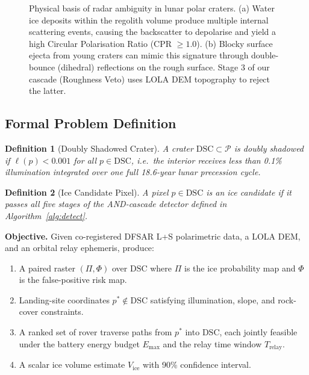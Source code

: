 \documentclass[10pt,conference]{IEEEtran}
\newtheorem{definition}{Definition}
\newcommand{\DSC}{\mathrm{DSC}}
\newcommand{\Vice}{V_{\mathrm{ice}}}
\begin{document}
\begin{figure}[htbp]
\caption{Physical basis of radar ambiguity in lunar polar craters. (a) Water ice deposits within the regolith volume produce multiple internal scattering events, causing the backscatter to depolarise and yield a high Circular Polarisation Ratio (CPR $\ge 1.0$). (b) Blocky surface ejecta from young craters can mimic this signature through double-bounce (dihedral) reflections on the rough surface. Stage 3 of our cascade (Roughness Veto) uses LOLA DEM topography to reject the latter.}
\label{fig:physics_ambiguity}
\end{figure}

\subsection{Formal Problem Definition}

\begin{definition}[Doubly Shadowed Crater]
A crater $\DSC \subset \mathcal{P}$ is doubly shadowed if $\ell(p) < 0.001$
for all $p \in \DSC$, i.e.\ the interior receives less than 0.1\%
illumination integrated over one full 18.6-year lunar precession cycle.
\end{definition}

\begin{definition}[Ice Candidate Pixel]
A pixel $p \in \DSC$ is an ice candidate if it passes all five stages
of the AND-cascade detector defined in Algorithm~\ref{alg:detect}.
\end{definition}

\textbf{Objective.}
Given co-registered DFSAR L+S polarimetric data, a LOLA DEM, and an
orbital relay ephemeris, produce:
\begin{enumerate}
  \item A paired raster $(\Pi, \Phi)$ over $\DSC$ where $\Pi$ is the
    ice probability map and $\Phi$ is the false-positive risk map.
  \item Landing-site coordinates $p^* \notin \DSC$ satisfying illumination,
    slope, and rock-cover constraints.
  \item A ranked set of rover traverse paths from $p^*$ into $\DSC$, each
    jointly feasible under the battery energy budget $E_{\max}$ and the
    relay time window $T_{\mathrm{relay}}$.
  \item A scalar ice volume estimate $\Vice$ with 90\% confidence interval.
\end{enumerate}
\end{document}
